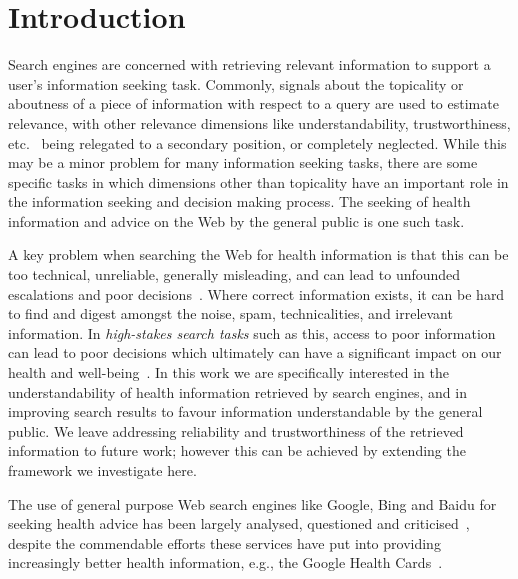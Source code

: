 \section*{Introduction} 
\label{chp:understanding_understandability}

Search engines are concerned with retrieving relevant information to support a user's information seeking task. Commonly, signals about the topicality or aboutness of a piece of information with respect to a query are used to estimate relevance, with other relevance dimensions like understandability, trustworthiness, etc.~\cite{zhang2014multidimensional} being relegated to a secondary position, or completely neglected. While this may be a minor problem for many information seeking tasks, there are some specific tasks in which dimensions other than topicality have an important role in the information seeking and decision making process. The seeking of health information and advice on the Web by the general public is one such task. 

A key problem when searching the Web for health information is that this can be too technical, unreliable, generally misleading, and can lead to unfounded escalations and poor decisions~\cite{white09b}. Where correct information exists, it can be hard to find and digest amongst the noise, spam, technicalities, and irrelevant information. In \textit{high-stakes search tasks} such as this, access to poor information can lead to poor decisions which ultimately can have a significant impact on our health and well-being~\cite{white09b,white13}. In this work we are specifically interested in the understandability of health information retrieved by search engines, and in improving search results to favour information understandable by the general public. We leave addressing reliability and trustworthiness of the retrieved information to future work; however this can be achieved by extending the framework we investigate here.

The use of general purpose Web search engines like Google, Bing and Baidu for seeking health advice has been largely analysed, questioned and criticised~\cite{graber99,fitzsimmons10,wiener13,patel13,atcherson14,meillier17,ellimoottil12}, despite the commendable efforts these services have put into providing increasingly better health information, e.g., the Google Health Cards~\cite{gabrilovich2016cura}. 

